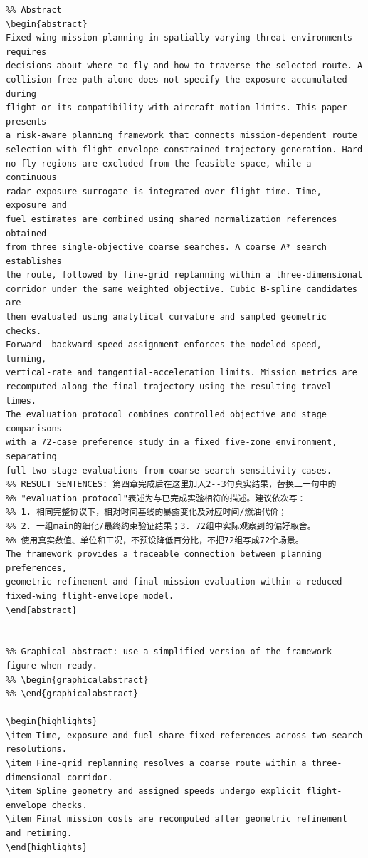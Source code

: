 \documentclass[12pt]{article}
\begin{document}
\begin{verbatim}
%% Abstract
\begin{abstract}
Fixed-wing mission planning in spatially varying threat environments requires
decisions about where to fly and how to traverse the selected route. A
collision-free path alone does not specify the exposure accumulated during
flight or its compatibility with aircraft motion limits. This paper presents
a risk-aware planning framework that connects mission-dependent route
selection with flight-envelope-constrained trajectory generation. Hard
no-fly regions are excluded from the feasible space, while a continuous
radar-exposure surrogate is integrated over flight time. Time, exposure and
fuel estimates are combined using shared normalization references obtained
from three single-objective coarse searches. A coarse A* search establishes
the route, followed by fine-grid replanning within a three-dimensional
corridor under the same weighted objective. Cubic B-spline candidates are
then evaluated using analytical curvature and sampled geometric checks.
Forward--backward speed assignment enforces the modeled speed, turning,
vertical-rate and tangential-acceleration limits. Mission metrics are
recomputed along the final trajectory using the resulting travel times.
The evaluation protocol combines controlled objective and stage comparisons
with a 72-case preference study in a fixed five-zone environment, separating
full two-stage evaluations from coarse-search sensitivity cases.
%% RESULT SENTENCES: 第四章完成后在这里加入2--3句真实结果，替换上一句中的
%% "evaluation protocol"表述为与已完成实验相符的描述。建议依次写：
%% 1. 相同完整协议下，相对时间基线的暴露变化及对应时间/燃油代价；
%% 2. 一组main的细化/最终约束验证结果；3. 72组中实际观察到的偏好取舍。
%% 使用真实数值、单位和工况，不预设降低百分比，不把72组写成72个场景。
The framework provides a traceable connection between planning preferences,
geometric refinement and final mission evaluation within a reduced
fixed-wing flight-envelope model.
\end{abstract}


%% Graphical abstract: use a simplified version of the framework figure when ready.
%% \begin{graphicalabstract}
%% \end{graphicalabstract}

\begin{highlights}
\item Time, exposure and fuel share fixed references across two search resolutions.
\item Fine-grid replanning resolves a coarse route within a three-dimensional corridor.
\item Spline geometry and assigned speeds undergo explicit flight-envelope checks.
\item Final mission costs are recomputed after geometric refinement and retiming.
\end{highlights}


\end{verbatim}
\end{document}

